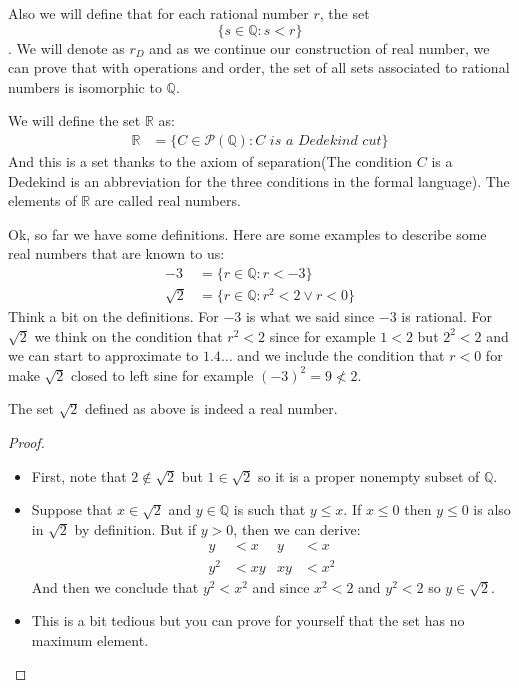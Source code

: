 \documentclass{tufte-handout}
\begin{document}
Also we will define that for each rational number $r$, the set $$\{s \in \mathbb{Q}: s < r\}$$. We will denote as $r_D$ and as we continue our construction of real number, we can prove that with operations and order, the set of all sets associated to rational numbers is isomorphic to $\mathbb{Q}$. 

\begin{definition}
	We will define the set $\mathbb{R}$ as:
	\begin{align*}
		\mathbb{R} &= \{C \in \mathcal{P}(\mathbb{Q}): C \textit{ is a Dedekind cut}\}
	\end{align*}
	And this is a set thanks to the axiom of separation(The condition $C$ is a Dedekind is an abbreviation for the three conditions in the formal language). The elements of $\mathbb{R}$ are called real numbers.
\end{definition}

Ok, so far we have some definitions. Here are some examples to describe some real numbers that are known to us:
\begin{align*}
	-3 &= \{r \in \mathbb{Q}: r < -3\}\\
	\sqrt{2} &= \{r \in \mathbb{Q}: r^2 < 2 \vee r < 0\}
\end{align*}
Think a bit on the definitions. For $-3$ is what we said since $-3$ is rational. For $\sqrt{2}$ we think on the condition that $r^2 < 2$ since for example $1 < 2$ but $2^2 < 2$ and we can start to approximate to $1.4\dots$ and we include the condition that $r < 0$ for make $\sqrt{2}$ closed to left sine for example $(-3)^2 = 9 \not < 2$.\\

\begin{theorem}
	The set $\sqrt{2}$ defined as above is indeed a real number.
\end{theorem}
\begin{proof}
	\begin{itemize}
		\item First, note that $2 \not \in \sqrt{2}$ but $1 \in \sqrt{2}$ so it is a proper nonempty subset of $\mathbb{Q}$.
		\item Suppose that $x \in \sqrt{2}$ and $y \in \mathbb{Q}$ is such that $y \le x$. If $x \le 0$ then $y \le 0$ is also in $\sqrt{2}$ by definition. But if $y > 0$, then we can derive:
		\begin{align*}
			y &< x & y &< x\\
			y^2 &< xy & xy &< x^2
		\end{align*} 
		And then we conclude that $y^2 < x^2$ and since $x^2 < 2$ and $y^2 < 2$ so $y \in \sqrt{2}$.
		\item This is a bit tedious but you can prove for yourself that the set has no maximum element.
	\end{itemize}
\end{proof}
\end{document}
